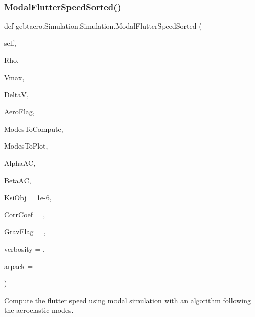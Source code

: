 \subsubsection{\texorpdfstring{Modal\+Flutter\+Speed\+Sorted()}{ModalFlutterSpeedSorted()}}
{\footnotesize\ttfamily def gebtaero.\+Simulation.\+Simulation.\+Modal\+Flutter\+Speed\+Sorted (\begin{DoxyParamCaption}\item[{}]{self,  }\item[{}]{Rho,  }\item[{}]{Vmax,  }\item[{}]{DeltaV,  }\item[{}]{Aero\+Flag,  }\item[{}]{Modes\+To\+Compute,  }\item[{}]{Modes\+To\+Plot,  }\item[{}]{Alpha\+AC,  }\item[{}]{Beta\+AC,  }\item[{}]{Ksi\+Obj = {\ttfamily 1e-\/6},  }\item[{}]{Corr\+Coef = {},  }\item[{}]{Grav\+Flag = {},  }\item[{}]{verbosity = {},  }\item[{}]{arpack = {} }\end{DoxyParamCaption})}



Compute the flutter speed using modal simulation with an algorithm following the aeroelastic modes. 


